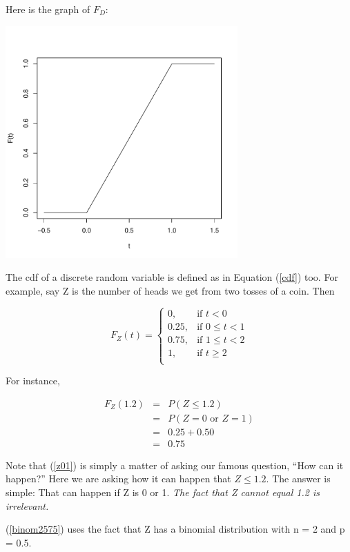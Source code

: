 Here is the graph of $F_D$: 

\includegraphics[width=3.5in]{FD.pdf}

The cdf of a discrete random variable is defined as in Equation
(\ref{cdf}) too.  For example, say Z is the number of heads we get from
two tosses of a coin.  Then

\begin{equation}
\label{binomcdf}
F_Z(t) =
\begin{cases}
0, & \text{if $t <  0$} \\
0.25, & \text{if $0 \leq t <  1$} \\
0.75, & \text{if $1 \leq t <  2$} \\
1, & \text{if $t \geq 2$} \\
\end{cases}
\end{equation}

For instance, 

\begin{eqnarray}
F_Z(1.2) &=& P(Z \leq 1.2) \\ 
&=& P(Z = 0 \textrm{ or } Z = 1) \label{z01} \\
&=& 0.25 + 0.50 \label{binom2575} \\
&=& 0.75
\end{eqnarray}

Note that (\ref{z01}) is simply a matter of asking our famous question,
``How can it happen?''  Here we are asking how it can happen that $Z
\leq 1.2$.  The answer is simple:  That can happen if Z is 0 or 1.  {\it
The fact that Z cannot equal 1.2 is irrelevant.}

(\ref{binom2575}) uses the fact that Z has a binomial
distribution with n = 2 and p = 0.5.

